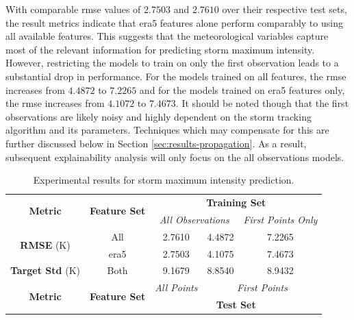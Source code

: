 With comparable \acrshort{rmse} values of $2.7503$ and $2.7610$ over their respective test sets, the result metrics indicate that \acrshort{era5} features alone perform comparably to using all available features. This suggests that the meteorological variables capture most of the relevant information for predicting storm maximum intensity. However, restricting the models to train on only the first observation leads to a substantial drop in performance. For the models trained on all features, the \acrshort{rmse} increases from $4.4872$ to $7.2265$ and for the models trained on \acrshort{era5} features only, the \acrshort{rmse} increases from $4.1072$ to $7.4673$. It should be noted though that the first observations are likely noisy and highly dependent on the storm tracking algorithm and its parameters. Techniques which may compensate for this are further discussed below in Section \ref{sec:results-propagation}. As a result, subsequent explainability analysis will only focus on the all observations models.

\begin{table}[ht]
\centering
\caption{Experimental results for storm maximum intensity prediction.}
\label{tab:storm_max_intensity_results}
\begin{tabular}{|c|c|c|c|c|}
\hline
\multirow{2}{*}{\textbf{Metric}} & \multirow{2}{*}{\textbf{Feature Set}} & \multicolumn{3}{c|}{\textbf{Training Set} } \\ \cline{3-5}
 & & \multicolumn{2}{c|}{\textit{All Observations}} & \textit{First Points Only} \\
\hline \hline
\multirow{2}{*}{\textbf{RMSE} (\unit{\kelvin})} & All & 2.7610 & 4.4872 & 7.2265 \\
 & \acrshort{era5} & 2.7503 & 4.1075 & 7.4673 \\
\hline
\textbf{Target Std} (\unit{\kelvin}) & Both & 9.1679 & 8.8540 & 8.9432 \\
\hline \hline
\multirow{2}{*}{\textbf{Metric}} & \multirow{2}{*}{\textbf{Feature Set}} & \textit{All Points} & \multicolumn{2}{c|}{\textit{First Points}} \\ \cline{3-5}
 & & \multicolumn{3}{c|}{\textbf{Test Set}} \\ 
\hline
\end{tabular}
\end{table}

